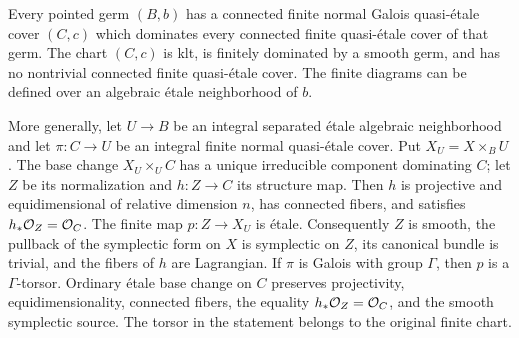 \begin{proposition}
\label{loc:maximal-charts}
Every pointed germ $(B,b)$ has a connected finite normal Galois
quasi-\'etale cover $(C,c)$ which dominates every connected finite
quasi-\'etale cover of that germ.  The chart $(C,c)$ is klt, is
finitely dominated by a smooth germ, and has no nontrivial connected
finite quasi-\'etale cover.  The finite diagrams can be defined over
an algebraic \'etale neighborhood of $b$.

More generally, let $U\to B$ be an integral separated \'etale algebraic
neighborhood and let $\pi:C\to U$ be an integral finite normal
quasi-\'etale cover.  Put $X_U=X\times_B U$.  The base change
$X_U\times_U C$ has a unique irreducible component dominating $C$;
let $Z$ be its normalization and $h:Z\to C$ its structure map.
Then $h$ is projective and equidimensional of relative dimension $n$,
has connected fibers, and satisfies $h_*\mathcal O_Z=\mathcal O_C$.  The finite map
$p:Z\to X_U$ is \'etale.  Consequently $Z$ is smooth, the pullback of
the symplectic form on $X$ is symplectic on $Z$, its canonical bundle is
trivial, and the fibers of $h$ are Lagrangian.  If $\pi$ is Galois with
group $\Gamma$, then $p$ is a $\Gamma$-torsor.  Ordinary \'etale base
change on $C$ preserves projectivity, equidimensionality, connected
fibers, the equality $h_*\mathcal O_Z=\mathcal O_C$, and the smooth symplectic source.
The torsor in the statement belongs to the original finite chart.
\end{proposition}

